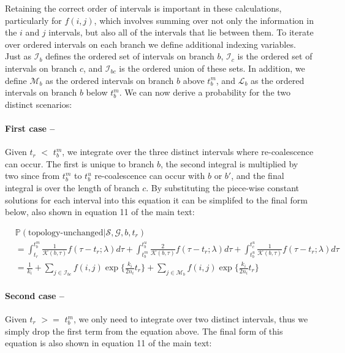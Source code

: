 \documentclass[11pt]{article}
\begin{document}
Retaining the correct order of intervals is important in these calculations, 
particularly for $f(i,j)$, which involves summing over not only the information
in the $i$ and $j$ intervals, but also all of the intervals that lie between 
them. To iterate over ordered intervals on each branch we define additional
indexing variables. Just as $\mathcal{I}_b$ defines the ordered set of intervals 
on branch $b$, $\mathcal{I}_c$ is the ordered set of intervals on branch $c$, and
$\mathcal{I}_{bc}$ is the ordered union of these sets. In addition, we define
$\mathcal{M}_{b}$ as the ordered intervals on branch $b$ above 
$t_b^m$, and $\mathcal{L}_{b}$ as the ordered intervals on branch $b$ 
below $t_b^m$.
We can now derive a probability for the two distinct scenarios:


\paragraph{First case --} Given $t_r$ $<$ $t_b^m$, we integrate over the three
distinct intervals where re-coalescence can occur. The first is unique to branch $b$, 
the second integral is multiplied by two since from $t_b^m$ to $t_b^u$ re-coalescence
can occur with $b$ or $b'$, and the final integral is over the length of branch $c$.
By substituting the piece-wise constant solutions for each interval into this equation
it can be simplifed to the final form below, also shown in equation 11 of the main text:

\begin{equation}
\begin{aligned}
	&\mathbb{P}(\text{topology-unchanged} | \mathcal{S}, \mathcal{G}, b, t_r) \\
	&= \int_{t_r}^{t_b^m}
	\frac{1}{\mathcal{K}(b,\tau)} f(\tau - t_r; \lambda) d\tau + 
	\int_{t_b^m}^{t_b^u}
	\frac{2}{\mathcal{K}(b,\tau)} f(\tau - t_r; \lambda) d\tau + 
	\int_{t_b^u}^{t_c^u} \frac{1}{\mathcal{K}(b,\tau)} f(\tau - t_r; \lambda) d\tau \\
	&= \frac{1}{k_i} + 
	\sum_{j \in \mathcal{I}_{bc}}	f(i,j) \exp \bigg\{	\frac{k_i}{2n_i} t_r \bigg\} + 
	\sum_{j \in \mathcal{M}_b}    f(i,j) \exp \bigg\{ \frac{k_i}{2n_i} t_r \bigg\}
\end{aligned}
\end{equation}

\paragraph{Second case --} Given $t_r$ $>=$ $t_b^m$, we only need to integrate over
two distinct intervals, thus we simply drop the first term from the equation above.
The final form of this equation is also shown in equation 11 of the main text:
\end{document}
